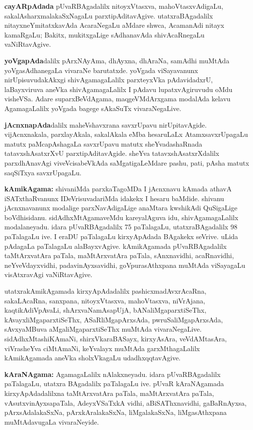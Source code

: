 \textbf{cayARpAdada} pUvaRBAgadalilx nitoyxVtasxva, mahoVtasxvAdigaLu, sakalAsharxmalakaSxNagaLu parxtipAditavAgive. utatxraBAgadalilx nitayxneYmitatxkavAda AcaraNegaLu aMdare shwca, AcamanAdi nitayx kamaRgaLu; Bakitx, mukitxgaLige sAdhanavAda shivAcaRnegaLu vaNiRta\-vAgive. 

\textbf{yoVgapAda}dalilx pArxNAyAma, dhAyxna, dhAraNa, samAdhi muMtAda yoVgasAdhanegaLa vivaraNe barutatxde. yoVgada viSayavanunx nirUpisuvudakAkxgi shivAgamagaLalilx parxteyxVka pAdavidadxrU, laBayxviruva aneVka shivAgamagaLalilx I pAdavu lupatxvAgiruvudu oMdu visheVSa. Adare suparxBeVdAgama, maqgeVMdArxgama modalAda kelavu AgamagaLalilx yoVgada bagege sAkaSuTx vivaraNegaLive. 

\textbf{jAcnxnapAda}dalilx maheVshavxrana savxrUpavu nirUpitavAgide. vijAcnxnakala, parxlayAkala, sakalAkala eMba hesaruLaLx AtamxsavxrUpagaLu matutx paMcapAshagaLa savxrUpavu matutx sheYvadashaRnada tatavxshAsatxrXvU parxtipAditavAgide. sheYva tatavxshAsatxrXdalilx parxdhAnavAgi viveVcisa\-beVkAda saMgatigaLeMdare pashu, pati, pAsha matutx saqSiTxya savxrUpagaLu.

\textbf{kAmikAgama:} shivaniMda parxkaTagoMDa I jAcnxnavu kAmada athavA iSATxthaRvanunx IDeVrisuvadariMda idakekx I hesaru baMdide. shivanu jAcnxnavanunx modalige parxNavAdigaLige anaMtara kwshikAdi QuSigaLige boVdhisidanu. sidAdhxMtAgamaveMdu kareyalAguva idu, shivAgamagaLalilx modalaneyadu. idara pUvaRBAgadalilx 75 paTalagaLu, utatxraBAgadalilx 98 paTalagaLu ive. I eraDU paTalagaLu kirxyApAdada BAgakekx seVrive. uLida pAdagaLa paTalagaLu alaBayxvAgive. kAmikAgamada pUvaRBAgadalilx taMtArxvatAra paTala, maMtArxvatAra paTala, sAnxnavidhi, acaRnavidhi, neYveVdayxvidhi, padavinAyxsavidhi, goVpurasAthxpana muMtAda viSayagaLu visAtxravAgi vaNiRtavAgive.

\eject

utatxrakAmikAgamada kirxyApAdadalilx pashicxmadAvxrAcaRna, sakaLAcaRna, sanxpana, nitoyxVtasxva, mahoVtasxva, niVrAjana, kaqtikAdiVpAvaLi, shArxvaNamAsapUjA, bANaliMgaparxtiSeThx, kAvayxliMgaparxtiSeThx, ASaRliMgapArxsAda, pwruSaliMgapArxsAda, sAvxyaMBuva aMga\-liMgaparxtiSeThx muMtAda vivaraNegaLive. sidAdhxMtashiKAmaNi, shirxVkaraBASayx, kirxyAsAra, veVdAMtasAra, viVrasheYva ciMtAmaNi, keYvalayx muMtAda garxMthagaLalilx kAmikAgamada aneVka sholxVkagaLu udadhxqqtavAgive.

\textbf{kAraNAgama:} AgamagaLalilx nAlakxneyadu. idara pUvaRBAgadalilx  paTalagaLu, utatxra BAgadalilx  paTalagaLu ive. pUvaR kAraNAgamada kirxyApAdadalilxna taMtArxvatAra paTala, maMtArxvatAra paTala, vAsutxvinAyxsapaTala, AdeyxVSaTxkA vidhi, aBiSAThxna\-vidhi, gaBaRnAyxsa, pArxsAdalakaSxNa, pArxkAralakaSxNa, liMgalakaSxNa, liMgasAthxpana muMtAdavugaLa vivaraNeyide.

